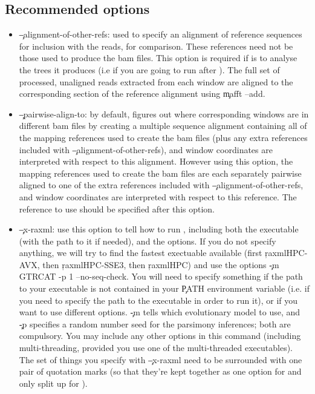 \subsection{Recommended options} \label{sec:RecArgs}
\begin{itemize}
\item \c{--alignment-of-other-refs}: used to specify an alignment of reference sequences for inclusion with the reads, for comparison.
These references need not be those used to produce the bam files.
This option is required if \p is to analyse the trees it produces (i.e if you are going to run \pat after \pmt).
The full set of processed, unaligned reads extracted from each window are aligned to the corresponding section of the reference alignment using \c{mafft --add}.
\item \c{--pairwise-align-to}: by default, \pmt figures out where corresponding windows are in different bam files by creating a multiple sequence alignment containing all of the mapping references used to create the bam files (plus any extra references included with \c{--alignment-of-other-refs}), and window coordinates are interpreted with respect to this alignment.
However using this option, the mapping references used to create the bam files are each separately pairwise aligned to one of the extra references included with \c{--alignment-of-other-refs}, and window coordinates are interpreted with respect to this reference.
The reference to use should be specified after this option.
\item \c{--x-raxml}: use this option to tell \pmt how to run \R, including both the executable (with the path to it if needed), and the options.
If you do not specify anything, we will try to find the fastest \R exectuable available (first \c{raxmlHPC-AVX}, then \c{raxmlHPC-SSE3}, then \c{raxmlHPC}) and use the options \c{-m GTRCAT -p 1 --no-seq-check}.
You will need to specify something if the path to your \R executable is not contained in your \c{PATH} environment variable (i.e. if you need to specify the path to the executable in order to run it), or if you want to use different \R options.
\c{-m} tells \R which evolutionary model to use, and \c{-p} specifies a random number seed for the parsimony inferences; both are compulsory.
You may include any other \R options in this command (including multi-threading, provided you use one of the multi-threaded executables).
The set of things you specify with \c{--x-raxml} need to be surrounded with one pair of quotation marks (so that they're kept together as one option for \pmt and only split up for \R).

\end{itemize}
